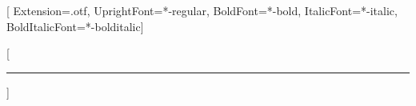 
\usepackage{fontspec}
\usepackage[french]{babel}
\usepackage[a4paper,margin=2.2cm,bottom=2.6cm]{geometry}
\usepackage{graphicx}
\usepackage{float}
\usepackage{booktabs}
\usepackage{tabularx}
\usepackage{array}
\usepackage[table]{xcolor}
\usepackage{caption}
\usepackage{enumitem}
\usepackage{titlesec}
\usepackage{fancyhdr}
\usepackage{hyperref}
\usepackage{xurl}

\setmainfont{texgyreheros}[
  Extension=.otf,
  UprightFont=*-regular,
  BoldFont=*-bold,
  ItalicFont=*-italic,
  BoldItalicFont=*-bolditalic]
\hypersetup{colorlinks=true, linkcolor=accent, urlcolor=accent}
\graphicspath{{figures/}}

[\vspace{-0.4em}\color{accent}\rule{\linewidth}{0.8pt}]
\titleformat{\subsection}{\large\bfseries}{\thesubsection}{0.6em}{}
\titlespacing*{\section}{0pt}{1.6em}{0.9em}

\setlength{\parskip}{0.45em}
\renewcommand{\arraystretch}{1.25}

\pagestyle{fancy}
\fancyhf{}
\fancyhead[R]{\small\color{ink2} \rapportversion}
\fancyfoot[R]{\small\color{ink2}\thepage}
\renewcommand{\headrulewidth}{0.3pt}

